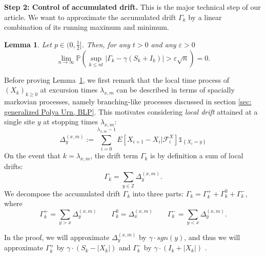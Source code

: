 \documentclass[twoside,12pt, a4paper]{article}
\newtheorem{lemma}{Lemma}[section]
\numberwithin{equation}{section}
\theoremstyle{remark}
\newcommand{\abs}[1]{\left\vert #1 \right\vert}
\newcommand\TBD{\textcolor{red}{TBD.}}
\newcommand{\comment}[1]{\textcolor{blue}{(Comment: #1)}}
\begin{document}
	\textbf{Step 2: Control of accumulated drift.} This is the major technical step of our article. We want to approximate the accumulated drift $\Gamma_k$ by a linear combination of its running maximum and minimum.
	\begin{lemma}\label{lm: control of acc drift}
		Let $p\in (0,\frac{1}{2}]$. Then, for any $t>0$ and any $\varepsilon >0$
		\begin{equation}\label{eq: control of acc drift}
			\lim_{n \to \infty }\mathbb{P}\left(\sup_{k\leq nt} \abs{\Gamma_k - \gamma \left(S_k + I_k \right)   } > \varepsilon \sqrt{n}  \right) =0. 
		\end{equation}
	\end{lemma}
	Before proving Lemma~\ref{lm: control of acc drift}, we first remark that the local time process of $(X_k)_{k \ge 0}$ at excursion times $\lambda_{x,m}$ can be described in terms of spacially markovian processes, namely branching-like processes discussed in section \ref{sec: generalized Polya Urn, BLP}. This motivates considering \textit{local drift} attained at a single site $y$ at stopping times $\lambda_{x, m}$:
	\begin{equation}\label{eq: accumulated local drift}
		\Delta_y^{(x,m)}:= \sum_{i=0}^{\lambda_{x,m}-1} E\left[X_{i+1}-X_i\vert \mathcal{F}_{i}^X\right] \mathbb{1}_{\left\{X_i=y\right\}}
	\end{equation}
	On the event that $k = \lambda_{x,m}$, the drift term $\Gamma_k$ is by definition a sum of local drifts:
	\begin{equation}\label{eq: drift in terms of local drifts}
		\Gamma_k = \sum_{y\in \mathbb{Z}} \Delta_y^{(x,m)}
		.\end{equation}
	We decompose the accumulated drift $\Gamma_k$ into three parts: $\Gamma_k = 	\Gamma_k^+ +	\Gamma_k^0 + \Gamma_k^-$, where 
	\[
	\Gamma_k^{+} = \sum_{y > x} \Delta_y^{(x,m)}\qquad 
	\Gamma_k^{0} = \Delta_x^{(x,m)} \qquad
	\Gamma_k^{-} = \sum_{y < x} \Delta_y^{(x,m)}
	.\]
	\iffalse
	\begin{align*}
		\Gamma_k^{+ \phantom{0}} &= \sum_{y > x} \Delta_y^{(x,m)}\\
		\Gamma_k^{0 \phantom{+}} &= \Delta_x^{(x,m)} \\[0.6em]
		\Gamma_k^{- \phantom{0}} &= \sum_{y < x} \Delta_{y}^{(x,m)}
		.\end{align*} 
	\fi
	In the proof, we will approximate $\Delta_y^{(x,m)}$ by $\gamma\cdot sgn(y)$, and thus we will approximate $\Gamma_k^+$ by $\gamma \cdot (S_k - \abs{X_k})$ and $\Gamma_k^-$ by $ \gamma \cdot (I_k + \abs{X_k} )$
	.
	
\end{document}
